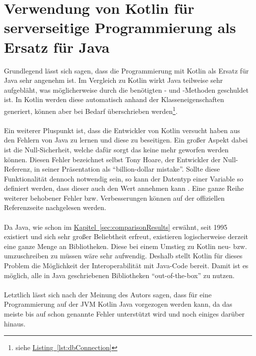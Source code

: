 \section{Verwendung von Kotlin für serverseitige Programmierung als Ersatz für Java}\label{sec:conclusionKotlinJava}
Grundlegend lässt sich sagen, dass die Programmierung mit Kotlin als Ersatz für Java sehr angenehm ist. Im Vergleich zu Kotlin wirkt Java teilweise sehr aufgebläht, was möglicherweise durch die benötigten - und -Methoden geschuldet ist. In Kotlin werden diese automatisch anhand der Klasseneigenschaften generiert, können aber bei Bedarf überschrieben werden\footnote{siehe \hyperref[lst:dbConnection]{Listing~\ref{lst:dbConnection}}}.\\
\\
Ein weiterer Pluspunkt ist, dass die Entwickler von Kotlin versucht haben aus den Fehlern von Java zu lernen und diese zu beseitigen. Ein großer Aspekt dabei ist die Null-Sicherheit, welche dafür sorgt das keine  mehr geworfen werden können. Diesen Fehler bezeichnet selbst Tony Hoare, der Entwickler der Null-Referenz, in seiner Präsentation \cite{billionDollorMistake} als \enquote{billion-dollar mistake}. Sollte diese Funktionalität dennoch notwendig sein, so kann der Datentyp einer Variable so definiert werden, dass dieser auch den Wert  annehmen kann \cite{kotlinNullSafety}. Eine ganze Reihe weiterer behobener Fehler bzw. Verbesserungen können auf der offiziellen Referenzseite \cite{kotlinComparisionJava} nachgelesen werden.\\
\\
Da Java, wie schon im \hyperref[sec:comparisonResults]{Kapitel~\ref{sec:comparisonResults}} erwähnt, seit 1995 existiert und sich sehr großer Beliebtheit erfreut, existieren logischerweise derzeit eine ganze Menge an Bibliotheken. Diese bei einem Umstieg zu Kotlin neu- bzw. umzuschreiben zu müssen wäre sehr aufwendig. Deshalb stellt Kotlin für dieses Problem die Möglichkeit der Interoperabilität mit Java-Code bereit. Damit ist es möglich, alle in Java geschriebenen Bibliotheken \enquote{out-of-the-box} zu nutzen.\\
\\
Letztlich lässt sich nach der Meinung des Autors sagen, dass für eine Programmierung auf der \gls{JVM} Kotlin Java vorgezogen werden kann, da das meiste bis auf schon genannte Fehler unterstützt wird und noch einiges darüber hinaus.

